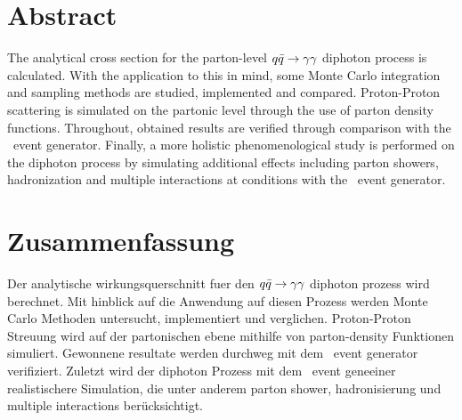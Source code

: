 \section*{Abstract}

The analytical cross section for the parton-level \(q\bar{q}\rightarrow\gamma\gamma\) diphoton
process is calculated.  With the application to this in mind, some
Monte Carlo integration and sampling methods are studied, implemented
and compared. Proton-Proton scattering is simulated on the partonic
level through the use of parton density functions. Throughout,
obtained results are verified through comparison with the \sherpa\
event generator. Finally, a more holistic phenomenological study is
performed on the diphoton process by simulating additional effects
including parton showers, hadronization and multiple interactions at
\lhc conditions with the \sherpa\ event generator.

\section*{Zusammenfassung}

Der analytische wirkungsquerschnitt fuer den \(q\bar{q}\rightarrow\gamma\gamma\) diphoton prozess
wird berechnet. Mit hinblick auf die Anwendung auf diesen Prozess
werden Monte Carlo Methoden untersucht, implementiert und
verglichen. Proton-Proton Streuung wird auf der partonischen ebene
mithilfe von parton-density Funktionen simuliert.  Gewonnene resultate
werden durchweg mit dem \sherpa\ event generator verifiziert. Zuletzt
wird der diphoton Prozess mit dem \sherpa\ event geneeiner
realistischere Simulation, die unter anderem parton shower,
hadronisierung und multiple interactions ber\"ucksichtigt.

